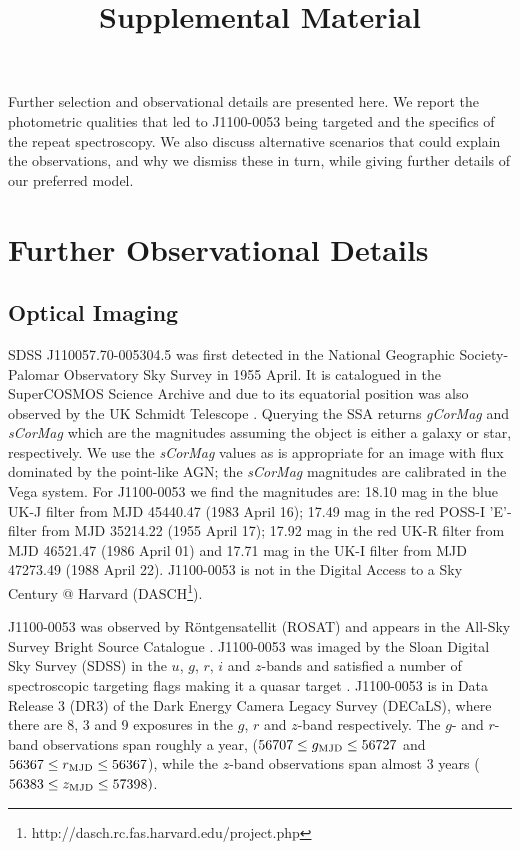 \documentclass[11pt,a4paper]{article}
\begin{document}
\title{Supplemental Material}
\maketitle

Further selection and observational details are presented here. We
report the photometric qualities that led to J1100-0053 being targeted
and the specifics of the repeat spectroscopy. We also discuss
alternative scenarios that could explain the observations, and why we
dismiss these in turn, while giving further details of our preferred
model.


\section{Further Observational Details}

\subsection{Optical Imaging}
SDSS J110057.70-005304.5 was first detected in the National Geographic
Society-Palomar Observatory Sky Survey \cite[NGS-POSS; ][]{Abell1959,
Minkowski_Abell1963book} in 1955 April. It is catalogued in the
SuperCOSMOS Science Archive \cite[\href{http://ssa.roe.ac.uk/}{SSA};
][]{Hambly2001_I, Hambly2001_II} and due to its equatorial position
was also observed by the UK Schmidt Telescope \cite[UKST;
][]{Cannon1975, Cannon1979book}. Querying the SSA returns {\it
gCorMag} and {\it sCorMag} which are the magnitudes assuming the
object is either a galaxy or star, respectively. We use the {\it
sCorMag} values as is appropriate for an image with flux dominated by
the point-like AGN; the {\it sCorMag} magnitudes are calibrated in the
Vega system. For J1100-0053 we find the magnitudes are: 18.10 mag in
the blue UK-J filter from MJD 45440.47 (1983 April 16); 17.49 mag in
the red POSS-I 'E'-filter from MJD 35214.22 (1955 April 17); 17.92 mag
in the red UK-R filter from MJD 46521.47 (1986 April 01) and 17.71 mag
in the UK-I filter from MJD 47273.49 (1988 April 22). J1100-0053 is
not in the Digital Access to a Sky Century @ Harvard
(DASCH\footnote{http://dasch.rc.fas.harvard.edu/project.php}).

J1100-0053 was observed by R\"{o}ntgensatellit (ROSAT) and appears in
the All-Sky Survey Bright Source Catalogue \citep[RASS-BSC;
][]{Appenzeller1998, Voges1999}.  J1100-0053 was imaged by the Sloan
Digital Sky Survey (SDSS) in the $u$, $g$, $r$, $i$ and $z$-bands and
satisfied a number of spectroscopic targeting flags making it a quasar
target \citep{Richards2002}.  J1100-0053 is in Data Release 3 (DR3) of
the Dark Energy Camera Legacy Survey (DECaLS), where there are 8, 3
and 9 exposures in the $g$, $r$ and $z$-band respectively. The $g$-
and $r$-band observations span roughly a year, ($56707 \leq g_{\rm
MJD} \leq 56727$ and $56367 \leq r_{\rm MJD} \leq 56367$), while the
$z$-band observations span almost 3 years ($56383 \leq z_{\rm MJD}
\leq 57398)$.
\end{document}
